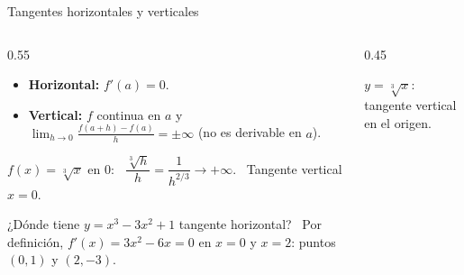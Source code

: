 \documentclass[10pt,aspectratio=169]{beamer}
\begin{document}
\begin{frame}{Tangentes horizontales y verticales}
  \begin{columns}
    \begin{column}{0.55\textwidth}
      \begin{itemize}
        \item \textbf{Horizontal:} $f'(a)=0$.
        \item \textbf{Vertical:} $f$ continua en $a$ y $\displaystyle\lim_{h\to0}\frac{f(a+h)-f(a)}{h}=\pm\infty$ (no es derivable en $a$).
      \end{itemize}
      \begin{ejemplo}[6]
        $f(x)=\sqrt[3]x$ en $0$: \ $\dfrac{\sqrt[3]h}{h}=\dfrac1{h^{2/3}}\to+\infty$. \ Tangente vertical $x=0$.
      \end{ejemplo}
      \begin{ejemplo}[7]
        ¿Dónde tiene $y=x^3-3x^2+1$ tangente horizontal? \ Por definición, $f'(x)=3x^2-6x=0$ en $x=0$ y $x=2$: puntos $(0,1)$ y $(2,-3)$.
      \end{ejemplo}
    \end{column}
    \begin{column}{0.45\textwidth}
      \centering

      \small $y=\sqrt[3]x$: tangente vertical en el origen.
    \end{column}
  \end{columns}
\end{frame}
\end{document}
